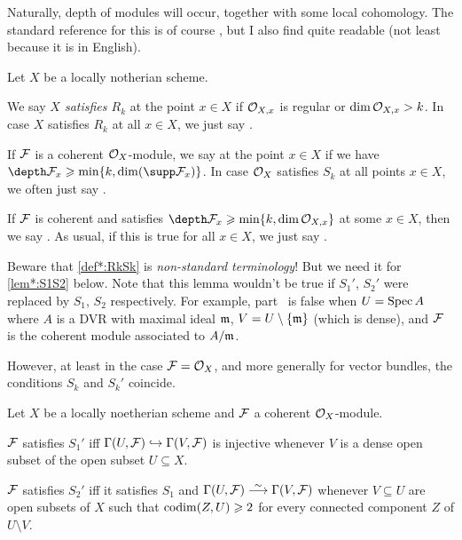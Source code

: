 Naturally, depth of modules will occur, together with some local cohomology. The standard reference for this is of course \cite{sga2}, but I also find \cite{LocalCohomology} quite readable (not least because it is in English).
\begin{defi*}\label{def*:RkSk}
	Let $X$ be a locally notherian scheme.
	\begin{alphanumerate}
		\item We say \emph{$X$ satisfies $R_k$} at the point $x\in X$ if $\mathcal{O}_{X,x}$ is regular or  $\dim\mathcal{O}_{X,x}> k$. In case $X$ satisfies $R_k$ at all $x\in X$, we just say .
		\item If $\mathcal{F}$ is a coherent $\mathcal{O}_X$-module, we say  at the point $x\in X$ if we have $\depth \Ff_x\geq \min\{k,\dim(\supp \Ff_x)\}$. In case $\mathcal{O}_X$ satisfies $S_k$ at all points $x\in X$, we often just say .
		\item If $\mathcal{F}$ is coherent and satisfies $\depth \Ff_x\geq \min\{k,\dim \Oo_{X,x}\}$ at some $x\in X$, then we say . As usual, if this is true for all $x\in X$, we just say .
	\end{alphanumerate}
\end{defi*}
\begin{warn*}\label{warn*:SkFail}
	Beware that \cref{def*:RkSk} is \emph{non-standard terminology}! But we need it for \cref{lem*:S1S2} below. Note that this lemma wouldn't be true if $S_1'$, $S_2'$ were replaced by $S_1$, $S_2$ respectively. For example, part~ is false when $U=\operatorname{Spec} A$ where $A$ is a DVR with maximal ideal $\mathfrak{m}$, $V=U\setminus\{\mathfrak{m}\}$ (which is dense), and $\mathcal{F}$ is the coherent module associated to $A/\mathfrak{m}$.
	
	However, at least in the case $\mathcal{F}=\mathcal{O}_X$, and more generally for vector bundles, the conditions $S_k$ and $S_k'$ coincide.
\end{warn*}
\begin{lem*}\label{lem*:S1S2}
	Let $X$ be a locally noetherian scheme and $\mathcal{F}$ a coherent $\mathcal{O}_X$-module.
	\begin{alphanumerate}
			\item $\mathcal{F}$ satisfies $S_1'$ iff $\Global(U,\Ff)\monomorphism\Global(V,\Ff)$ is injective whenever $V$ is a dense open subset of the open subset $U\subseteq X$.
			\item $\mathcal{F}$ satisfies $S_2'$ iff it satisfies $S_1$ and $\Global(U,\Ff)\isomorphism\Global(V,\Ff)$ whenever $V\subseteq U$ are open subsets of $X$ such that $\operatorname{codim}(Z,U)\geqslant 2$ for every connected component $Z$ of $U\setminus V$.
	\end{alphanumerate}
\end{lem*}
